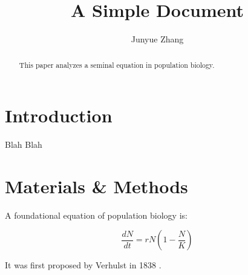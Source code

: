 \documentclass[12pt]{article}
\title{A Simple Document}
\author{Junyue Zhang}
\date{}
\begin{document}
  \maketitle

  \begin{abstract}
    This paper analyzes a seminal equation in population biology.
  \end{abstract}

  \section{Introduction}
    Blah Blah

   \section{Materials \& Methods}
   A foundational equation of population biology is:

   \begin{equation}
     \frac{dN}{dt} = r N (1 - \frac{N}{K})
   \end{equation}

   It was first proposed by Verhulst in 1838 \cite{verhulst1838notice}.

   

   
\end{document}
